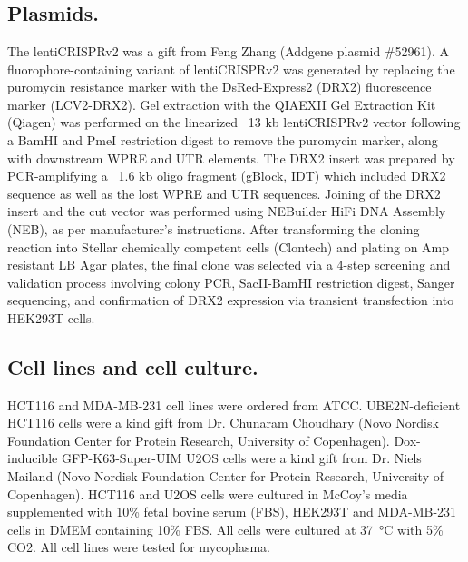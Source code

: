 
\section*{}

\subsection{Plasmids.}
The lentiCRISPRv2 was a gift from Feng Zhang (Addgene plasmid \#52961)\cite{Sanjana2014}. A fluorophore-containing variant of lentiCRISPRv2 was generated by replacing the puromycin resistance marker with the DsRed-Express2 (DRX2) fluorescence marker (LCV2-DRX2)\cite{Strack2008}. Gel extraction with the QIAEXII Gel Extraction Kit (Qiagen) was performed on the linearized ~13 kb lentiCRISPRv2 vector following a BamHI and PmeI restriction digest to remove the puromycin marker, along with downstream WPRE and UTR elements. The DRX2 insert was prepared by PCR-amplifying a ~1.6 kb oligo fragment (gBlock, IDT) which included DRX2 sequence as well as the lost WPRE and UTR sequences. Joining of the DRX2 insert and the cut vector was performed using NEBuilder HiFi DNA Assembly (NEB), as per manufacturer's instructions. After transforming the cloning reaction into Stellar chemically competent cells (Clontech) and plating on Amp resistant LB Agar plates, the final clone was selected via a 4-step screening and validation process involving colony PCR, SacII-BamHI restriction digest, Sanger sequencing, and confirmation of DRX2 expression via transient transfection into HEK293T cells.

\subsection{Cell lines and cell culture.}
HCT116 and MDA-MB-231 cell lines were ordered from ATCC.
UBE2N-deficient HCT116 cells were a kind gift from Dr. Chunaram Choudhary (Novo Nordisk Foundation Center for Protein Research, University of Copenhagen). Dox-inducible GFP-K63-Super-UIM U2OS cells were a kind gift from Dr. Niels Mailand (Novo Nordisk Foundation Center for Protein Research, University of Copenhagen). HCT116 and U2OS cells were cultured in McCoy's media supplemented with 10\% fetal bovine serum (FBS), HEK293T and MDA-MB-231 cells in DMEM containing 10\% FBS. 
All cells were cultured at \SI{37}{\celsius} with 5\% CO2. All cell lines were tested for mycoplasma.

